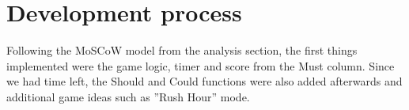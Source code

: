 \section{Development process}
Following the MoSCoW model from the analysis section, the first things implemented were the game logic, timer and score from the Must column. Since we had time left, the Should and Could functions were also added afterwards and additional game ideas such as ''Rush Hour'' mode.
